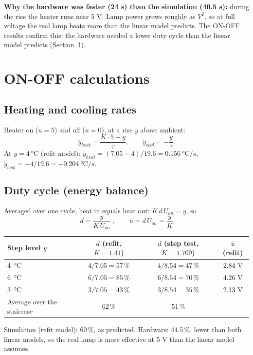 \documentclass[11pt,a4paper]{article}
\begin{document}
\begin{note}
\textbf{Why the hardware was faster (24 s) than the simulation (40.5 s):} during the rise the heater
runs near 5 V. Lamp power grows roughly as $V^2$, so at full voltage the real lamp heats more than
the linear model predicts. The ON-OFF results confirm this: the hardware needed a lower duty cycle
than the linear model predicts (Section~\ref{sec:onoff}).
\end{note}

\section{ON-OFF calculations}\label{sec:onoff}

\subsection{Heating and cooling rates}
Heater on ($u = 5$) and off ($u = 0$), at a rise $y$ above ambient:
\[
\dot y_{heat} = \frac{K\cdot5 - y}{\tau},\qquad \dot y_{cool} = -\frac{y}{\tau}.
\]
At $y = \SI{4}{\celsius}$ (refit model): $\dot y_{heat} = (7.05 - 4)/19.6 = \SI{0.156}{\celsius\per s}$,
$\dot y_{cool} = -4/19.6 = \SI{-0.204}{\celsius\per s}$.

\subsection{Duty cycle (energy balance)}
Averaged over one cycle, heat in equals heat out: $K\,d\,U_{on} = y$, so
\[
\boxed{\;d = \frac{y}{K\,U_{on}}\;},\qquad \bar u = d\,U_{on} = \frac{y}{K}.
\]
\begin{center}
\begin{tabular}{@{}lccc@{}}
\toprule
Step level $y$ & $d$ (refit, $K=1.41$) & $d$ (step test, $K=1.709$) & $\bar u$ (refit)\\
\midrule
\SI{4}{\celsius} & $4/7.05 = 57\,\%$ & $4/8.54 = 47\,\%$ & 2.84 V\\
\SI{6}{\celsius} & $6/7.05 = 85\,\%$ & $6/8.54 = 70\,\%$ & 4.26 V\\
\SI{3}{\celsius} & $3/7.05 = 43\,\%$ & $3/8.54 = 35\,\%$ & 2.13 V\\
\midrule
Average over the staircase & 62\,\% & 51\,\% & \\
\bottomrule
\end{tabular}
\end{center}
Simulation (refit model): 60\,\%, as predicted. Hardware: 44.5\,\%, lower than both linear models,
so the real lamp is more effective at 5 V than the linear model assumes.
\end{document}
